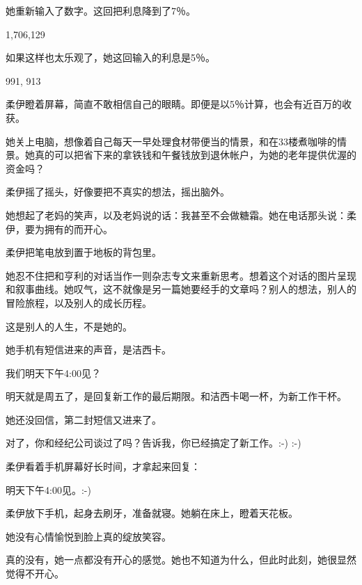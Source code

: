 她重新输入了数字。这回把利息降到了7％。

1,706,129

如果这样也太乐观了，她这回输入的利息是5％。

991, 913

柔伊瞪着屏幕，简直不敢相信自己的眼睛。即便是以5％计算，也会有近百万的收获。

她关上电脑，想像着自己每天一早处理食材带便当的情景，和在33楼煮咖啡的情景。她真的可以把省下来的拿铁钱和午餐钱放到退休帐户，为她的老年提供优渥的资金吗？

柔伊摇了摇头，好像要把不真实的想法，摇出脑外。

她想起了老妈的笑声，以及老妈说的话：我甚至不会做糖霜。她在电话那头说：柔伊，要为拥有的而开心。

柔伊把笔电放到置于地板的背包里。

她忍不住把和亨利的对话当作一则杂志专文来重新思考。想着这个对话的图片呈现和叙事曲线。她叹气，这不就像是另一篇她要经手的文章吗？别人的想法，别人的冒险旅程，以及别人的成长历程。

这是别人的人生，不是她的。

她手机有短信进来的声音，是洁西卡。

{\kaishu 我们明天下午4:00见？}

明天就是周五了，是回复新工作的最后期限。和洁西卡喝一杯，为新工作干杯。

她还没回信，第二封短信又进来了。

{\kaishu 对了，你和经纪公司谈过了吗？告诉我，你已经搞定了新工作。:-) :-)}

柔伊看着手机屏幕好长时间，才拿起来回复：

{\kaishu 明天下午4:00见。:-)}

柔伊放下手机，起身去刷牙，准备就寝。她躺在床上，瞪着天花板。

她没有心情愉悦到脸上真的绽放笑容。

真的没有，她一点都没有开心的感觉。她也不知道为什么，但此时此刻，她很显然觉得不开心。
